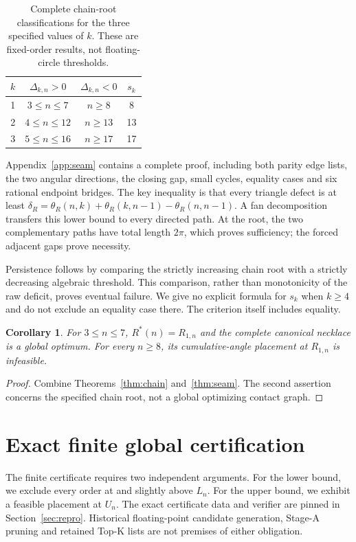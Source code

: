 \documentclass[11pt]{article}
\newtheorem{corollary}[theorem]{Corollary}
\theoremstyle{definition}
\theoremstyle{remark}
\newcommand{\Rstar}{R^*}
\begin{document}
\begin{table}[htbp]\centering
\caption{Complete chain-root classifications for the three specified values
of $k$. These are fixed-order results, not floating-circle thresholds.}
\label{tab:onsets}
\begin{tabular}{cccc}\toprule
$k$ & $\Delta_{k,n}>0$ & $\Delta_{k,n}<0$ & $s_k$\\\midrule
1 & $3\le n\le7$ & $n\ge8$ & 8\\
2 & $4\le n\le12$ & $n\ge13$ & 13\\
3 & $5\le n\le16$ & $n\ge17$ & 17\\\bottomrule
\end{tabular}
\end{table}

Appendix~\ref{app:seam} contains a complete proof, including both parity
edge lists, the two angular directions, the closing gap, small cycles,
equality cases and six rational endpoint bridges. The key inequality is
that every triangle defect is at least
$\delta_R=\theta_R(n,k)+\theta_R(k,n-1)-\theta_R(n,n-1)$.
A fan decomposition transfers this lower bound to every directed path.
At the root, the two complementary paths have total length $2\pi$,
which proves sufficiency; the forced adjacent gaps prove necessity.

Persistence follows by comparing the strictly increasing chain root with
a strictly decreasing algebraic threshold. This comparison, rather than
monotonicity of the raw deficit, proves eventual failure. We give no
explicit formula for $s_k$ when $k\ge4$ and do not exclude an equality
case there. The criterion itself includes equality.

\begin{corollary}\label{cor:small}
For $3\le n\le7$, $\Rstar(n)=R_{1,n}$ and the complete canonical
necklace is a global optimum. For every $n\ge8$, its cumulative-angle
placement at $R_{1,n}$ is infeasible.
\end{corollary}
\begin{proof}
Combine Theorems~\ref{thm:chain} and~\ref{thm:seam}. The second assertion
concerns the specified chain root, not a global optimizing contact graph.
\end{proof}

\section{Exact finite global certification}\label{sec:cert}
The finite certificate requires two independent arguments. For the lower
bound, we exclude every order at and slightly above $L_n$. For the upper bound,
we exhibit a feasible placement at $U_n$. The exact certificate data and
verifier are pinned in Section~\ref{sec:repro}. Historical floating-point
candidate generation,
Stage-A pruning and retained Top-K lists are not premises of either obligation.
\end{document}
